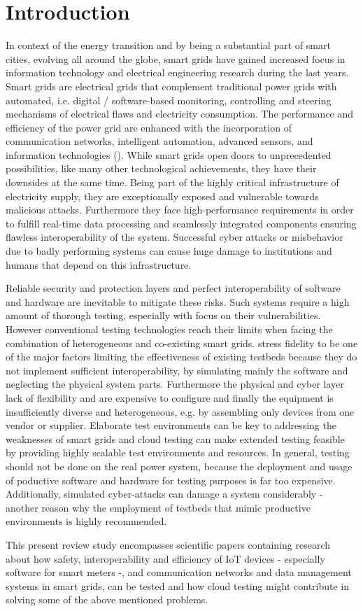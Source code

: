 \section{Introduction}
In context of the energy transition and by being a substantial part of smart cities, evolving all around the globe, smart grids have gained increased focus in information technology and electrical engineering research during the last years. Smart grids are electrical grids that complement traditional power grids with automated, i.e. digital / software-based monitoring, controlling and steering mechanisms of electrical flaws and electricity consumption. The performance and efficiency of the power grid are enhanced with the incorporation of communication networks, intelligent automation, advanced sensors, and information technologies (\citeauthor{smadi2021comprehensive}). While smart grids open doors to unprecedented possibilities, like many other technological achievements, they have their downsides at the same time. Being part of the highly critical infrastructure of electricity supply, they are exceptionally exposed and vulnerable towards malicious attacks. Furthermore they face high-performance requirements in order to fulfill real-time data processing and seamlessly integrated components ensuring flawless interoperability of the system. Successful cyber attacks or misbehavior due to badly performing systems can cause huge damage to institutions and humans that depend on this infrastructure.

Reliable security and protection layers and perfect interoperability of software and hardware are inevitable to mitigate these risks. Such systems require a high amount of thorough testing, especially with focus on their vulnerabilities. However conventional testing technologies reach their limits when facing the combination of heterogeneous and co-existing smart grids. \citeauthor{smadi2021comprehensive} stress fidelity to be one of the major factors limiting the effectiveness of existing testbeds because they do not implement sufficient interoperability, by simulating mainly the software and neglecting the physical system parts. Furthermore the physical and cyber layer lack of flexibility and are expensive to configure and finally the equipment is insufficiently diverse and heterogeneous, e.g. by assembling only devices from one vendor or supplier. Elaborate test environments can be key to addressing the weaknesses of smart grids and cloud testing can make extended testing feasible by providing highly scalable test environments and resources. In general, testing should not be done on the real power system, because the deployment and usage of poductive software and hardware for testing purposes is far too expensive. Additionally, simulated cyber-attacks can damage a system considerably - another reason why the employment of testbeds that mimic productive environments is highly recommended.

This present review study encompasses scientific papers containing research about how safety, interoperability and efficiency of IoT devices - especially software for smart meters -, and communication networks and data management systems in smart grids, can be tested and how cloud testing might contribute in solving some of the above mentioned problems.
